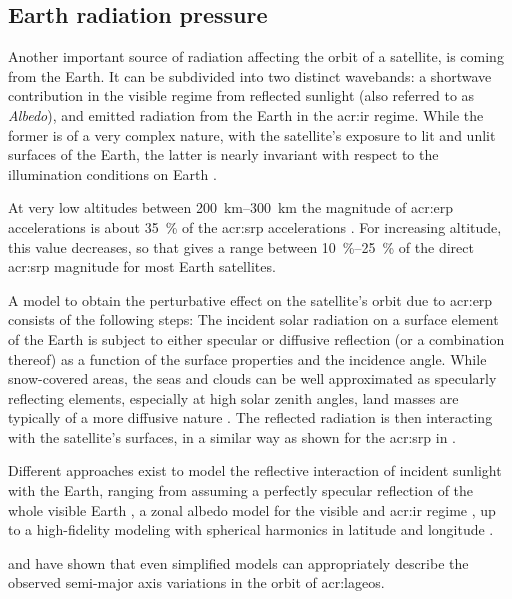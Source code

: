 \subsection{Earth radiation pressure}
\label{sec:propagation-state-albedo}
Another important source of radiation affecting the orbit of a satellite, is coming from the Earth. It can be subdivided into two distinct wavebands: a shortwave contribution 
in the visible regime from reflected sunlight (also referred to as \textit{Albedo}), and emitted radiation from the Earth in the \gls{acr:ir} regime. 
While the former is of a very complex nature, with the satellite's 
exposure to lit and unlit surfaces of the Earth, the latter is nearly invariant with respect to the illumination conditions on Earth \citep{knocke1989}.

At very low altitudes between \SIrange{200}{300}{\kilo\metre} the magnitude of \gls{acr:erp} accelerations is about 
\SI{35}{\percent} of the \gls{acr:srp} accelerations \citep{knocke1989}. For increasing altitude, this value decreases, so that \cite{knocke1989} gives 
a range between \SIrange{10}{25}{\percent} of the direct \gls{acr:srp} magnitude for most Earth satellites.

A model to obtain the perturbative effect on the satellite's orbit due to \gls{acr:erp} consists of the following steps: The incident solar radiation on a surface element 
of the Earth is subject to either specular or diffusive reflection (or a combination thereof) as a function of the surface properties and the incidence angle. While 
snow-covered areas, the seas and clouds can be well approximated as specularly reflecting elements, especially at high solar zenith angles, 
land masses are typically of a more diffusive nature \citep{barlier1986}. 
The reflected radiation is then interacting with the satellite's surfaces, in a similar way as shown for the \gls{acr:srp} in .

Different approaches exist to model the reflective interaction of incident sunlight with the Earth, ranging from assuming a perfectly specular reflection of the whole visible 
Earth \citep{vokrouhlicky1994}, a zonal albedo model for the visible and \gls{acr:ir} regime \citep{knocke1989}, up to a high-fidelity modeling with spherical harmonics in 
latitude and longitude \citep{sehnal1979}.

\cite{vokrouhlicky1994} and \cite{knocke1989} have shown that even simplified models can appropriately describe the observed semi-major axis variations in the orbit 
of \acrshort{acr:lageos}. 

